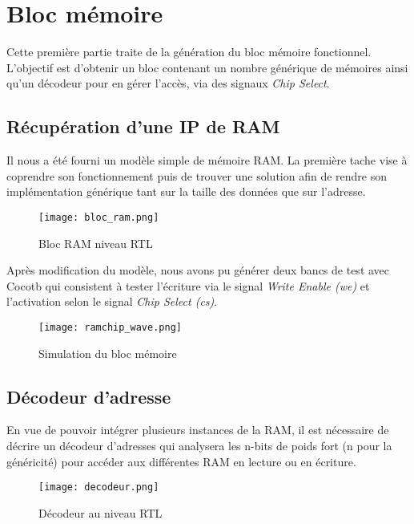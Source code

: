 \section{Bloc mémoire}

\indent Cette première partie traite de la génération du bloc mémoire fonctionnel. L'objectif est d'obtenir un bloc contenant un nombre générique de mémoires ainsi qu'un décodeur pour en gérer l'accès, via des signaux \textit{Chip Select}.

\subsection{Récupération d'une IP de RAM}

\indent Il nous a été fourni un modèle simple de mémoire RAM. La première tache vise à coprendre son fonctionnement puis de trouver une solution afin de rendre son implémentation générique tant sur la taille des données que sur l'adresse.

\begin{figure}[h]
	\centering
	\texttt{[image: bloc\_ram.png]}
	\caption{Bloc RAM niveau RTL}
	\label{fig:synth_bloc_ram}
\end{figure}

\indent Après modification du modèle, nous avons pu générer deux bancs de test avec Cocotb qui consistent à tester l'écriture via le signal \textit{Write Enable (we)} et l'activation selon le signal \textit{Chip Select (cs)}.

\begin{figure}[h]
	\centering
	\texttt{[image: ramchip\_wave.png]}
	\caption{Simulation du bloc mémoire}
	\label{fig:wave_bloc_ram}
\end{figure}

\newpage

\subsection{Décodeur d'adresse}

\indent En vue de pouvoir intégrer plusieurs instances de la RAM, il est nécessaire de décrire un décodeur d'adresses qui analysera les n-bits de poids fort (n pour la généricité) pour accéder aux différentes RAM en lecture ou en écriture.

\begin{figure}[h]
	\centering
	\texttt{[image: decodeur.png]}
	\caption{Décodeur au niveau RTL}
	\label{fig:synth_bloc_decodeur}
\end{figure}

